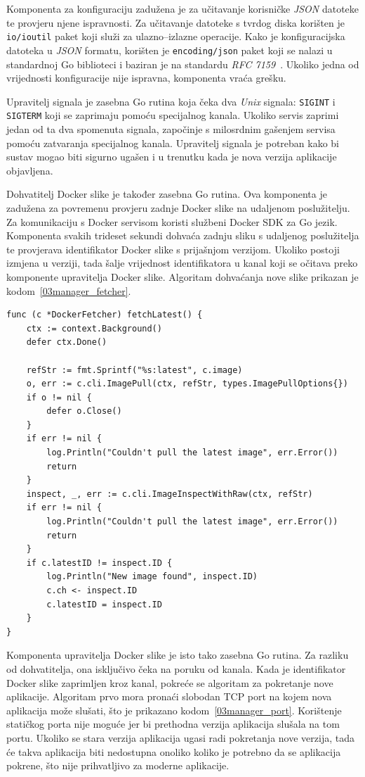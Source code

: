 Komponenta za konfiguraciju zadužena je za učitavanje korisničke \textit{JSON} datoteke te provjeru
njene ispravnosti. Za učitavanje datoteke s tvrdog diska korišten je \texttt{io/ioutil} paket koji
služi za ulazno--izlazne operacije. Kako je konfiguracijska datoteka u \textit{JSON} formatu,
korišten je \texttt{encoding/json} paket koji se nalazi u standardnoj Go biblioteci i baziran je na
standardu \textit{RFC 7159}~\citep{bray2017javascript}. Ukoliko jedna od vrijednosti konfiguracije
nije ispravna, komponenta vraća grešku.

Upravitelj signala je zasebna Go rutina koja čeka dva \textit{Unix} signala: \texttt{SIGINT} i
\texttt{SIGTERM} koji se zaprimaju pomoću specijalnog kanala. Ukoliko servis zaprimi jedan od ta dva
spomenuta signala, započinje s milosrdnim gašenjem servisa pomoću zatvaranja specijalnog kanala.
Upravitelj signala je potreban kako bi sustav mogao biti sigurno ugašen i u trenutku kada je nova
verzija aplikacije objavljena.

Dohvatitelj Docker slike je također zasebna Go rutina. Ova komponenta je zadužena za povremenu
provjeru zadnje Docker slike na udaljenom poslužitelju. Za komunikaciju s Docker servisom koristi
službeni Docker SDK za Go jezik. Komponenta svakih trideset sekundi dohvaća zadnju sliku s
udaljenog poslužitelja te provjerava identifikator Docker slike s prijašnjom verzijom. Ukoliko
postoji izmjena u verziji, tada šalje vrijednost identifikatora u kanal koji se očitava preko
komponente upravitelja Docker slike. Algoritam dohvaćanja nove slike prikazan je
kodom~\ref{03manager_fetcher}.

\begin{lstlisting}[float=h]
func (c *DockerFetcher) fetchLatest() {
	ctx := context.Background()
	defer ctx.Done()

	refStr := fmt.Sprintf("%s:latest", c.image)
	o, err := c.cli.ImagePull(ctx, refStr, types.ImagePullOptions{})
	if o != nil {
		defer o.Close()
	}
	if err != nil {
		log.Println("Couldn't pull the latest image", err.Error())
		return
	}
	inspect, _, err := c.cli.ImageInspectWithRaw(ctx, refStr)
	if err != nil {
		log.Println("Couldn't pull the latest image", err.Error())
		return
	}
	if c.latestID != inspect.ID {
		log.Println("New image found", inspect.ID)
		c.ch <- inspect.ID
		c.latestID = inspect.ID
	}
}
\end{lstlisting}

Komponenta upravitelja Docker slike je isto tako zasebna Go rutina. Za razliku od dohvatitelja, ona
isključivo čeka na poruku od kanala. Kada je identifikator Docker slike zaprimljen kroz kanal,
pokreće se algoritam za pokretanje nove aplikacije. Algoritam prvo mora pronaći slobodan TCP port na
kojem nova aplikacija može slušati, što je prikazano kodom~\ref{03manager_port}. Korištenje
statičkog porta nije moguće jer bi prethodna verzija aplikacija slušala na tom portu. Ukoliko se
stara verzija aplikacija ugasi radi pokretanja nove verzija, tada će takva aplikacija biti nedostupna
onoliko koliko je potrebno da se aplikacija pokrene, što nije prihvatljivo za moderne aplikacije.

